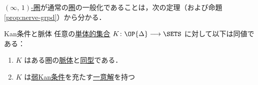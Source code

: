 \documentclass[TQFT_main]{subfiles}
\begin{document}
\hyperref[def:infinity-1]{$(\infty,\, 1)$-圏}が通常の\hyperref[def:category]{圏}の一般化であることは，次の定理（および命題\ref{prop:nerve-grpd}）から分かる．

\begin{mytheo}[label=thm:KanCplx]{Kan条件と脈体}
    任意の\hyperref[def:SimpSet]{単体的集合} $K \colon \OP{\Delta} \lto \SETS$ に対して以下は同値である：
    \begin{enumerate}
        \item $K$ はある圏の\hyperref[def:nerve]{脈体}と\hyperref[def:iso]{同型}である．
        \item $K$ は\hyperref[def:KanCplx]{弱Kan条件}を充たす\underline{一意解}を持つ
    \end{enumerate}
\end{mytheo}
\end{document}

